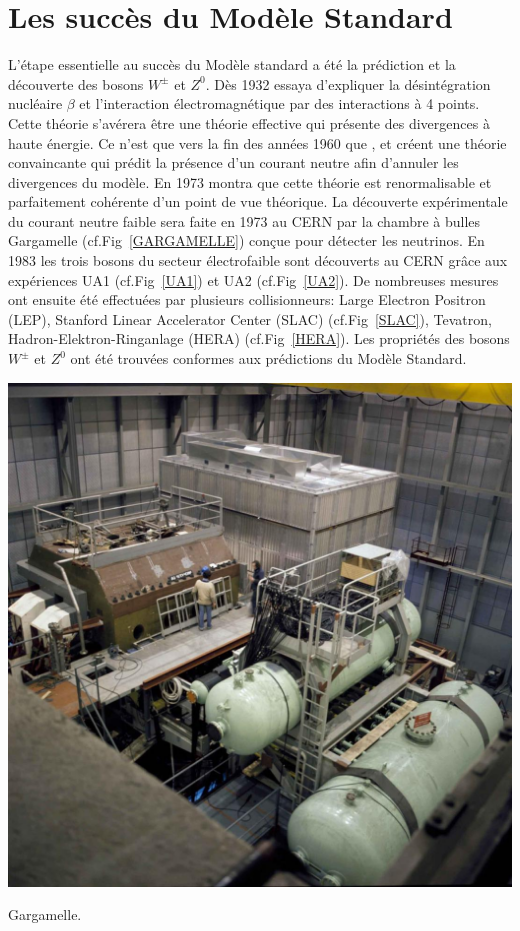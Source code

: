 \section{Les succès du Modèle Standard}
L'étape essentielle au succès du Modèle standard a été la prédiction et la découverte des bosons $W^{\pm}$ et $Z^{0}$. Dès \num{1932}  essaya d'expliquer la désintégration nucléaire $\beta$ et l'interaction électromagnétique par des interactions à \num{4} points. Cette théorie s'avérera être une théorie effective qui présente des divergences à haute énergie. Ce n'est que vers la fin des années \num{1960} que ,  et  créent une théorie convaincante qui prédit la présence d'un courant neutre afin d'annuler les divergences du modèle. En \num{1973}  montra que cette théorie est renormalisable et parfaitement cohérente d'un point de vue théorique. La découverte expérimentale du courant neutre faible sera faite en \num{1973} au CERN par la chambre à bulles Gargamelle (cf.Fig~\ref{GARGAMELLE}) conçue pour détecter les neutrinos. En \num{1983} les trois bosons du secteur électrofaible sont découverts au CERN grâce aux expériences UA1 (cf.Fig~\ref{UA1}) et UA2 (cf.Fig~\ref{UA2}). De nombreuses mesures ont ensuite été effectuées par plusieurs collisionneurs: Large Electron Positron (LEP), Stanford Linear Accelerator Center (SLAC) (cf.Fig~\ref{SLAC}), Tevatron, Hadron-Elektron-Ringanlage (HERA) (cf.Fig~\ref{HERA}). Les propriétés des bosons $W^{\pm}$ et $Z^{0}$ ont été trouvées conformes aux prédictions du Modèle Standard. 
\marginpar
{
	\centering
	\includegraphics[width=\marginparwidth]{SM/gargamelle.jpg}
	\captionsetup{type=figure}\caption{Gargamelle.}
	\label{GARGAMELLE}
}
